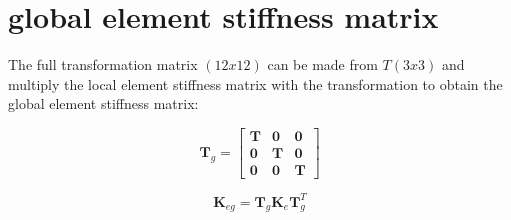 \section{global element stiffness matrix}
The full transformation matrix $ (12x12) $ can be made from $ T (3x3) $ and multiply the local element stiffness matrix with the transformation to obtain the global element stiffness matrix:

\begin{equation}\label{eq: full transformation matrix for plate.}
\mathbf{T}_g = \begin{bmatrix}
\mathbf{T} & \mathbf{0} & \mathbf{0} \\ 
\mathbf{0} & \mathbf{T} & \mathbf{0} \\ 
\mathbf{0} & \mathbf{0} & \mathbf{T}
\end{bmatrix} 
\end{equation}

\begin{equation}\label{eq: gobal element stiffness matrix}
\mathbf{K}_{eg} = \mathbf{T}_g \mathbf{K}_e \mathbf{T}_g^T
\end{equation}